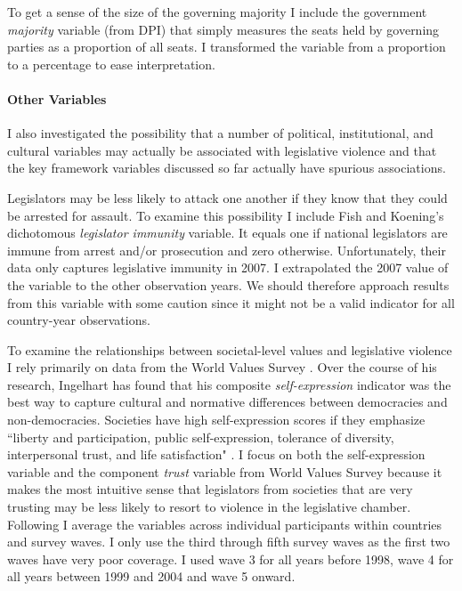 \documentclass[a4paper]{article}\usepackage{graphicx, color}
\begin{document}
To get a sense of the size of the governing majority I include the government {\emph{majority}} variable (from DPI) that simply measures the seats held by governing parties as a proportion of all seats. I transformed the variable from a proportion to a percentage to ease interpretation. 

\paragraph{Other Variables}

I also investigated the possibility that a number of political, institutional, and cultural variables may actually be associated with legislative violence and that the key framework variables discussed so far actually have spurious associations. 

Legislators may be less likely to attack one another if they know that they could be arrested for assault. To examine this possibility I include Fish and Koening's \citeyearpar{Fish2009} dichotomous \emph{legislator immunity} variable. It equals one if national legislators are immune from arrest and/or prosecution and zero otherwise. Unfortunately, their data only captures legislative immunity in 2007. I extrapolated the 2007 value of the variable to the other observation years. We should therefore approach results from this variable with some caution since it might not be a valid indicator for all country-year observations.

To examine the relationships between societal-level values and legislative violence I rely primarily on data from the World Values Survey \citep{WVS2009}. Over the course of his research, Ingelhart has found that his composite {\emph{self-expression}} indicator was the best way to capture cultural and normative differences between democracies and non-democracies. Societies have high self-expression scores if they emphasize ``liberty and participation, public self-expression, tolerance of diversity, interpersonal trust, and life satisfaction" \citep[64]{Inglehart2003}. I focus on both the self-expression variable and the component {\emph{trust}} variable from World Values Survey because it makes the most intuitive sense that legislators from societies that are very trusting may be less likely to resort to violence in the legislative chamber. Following \cite{Inglehart2003} I average the variables across individual participants within countries and survey waves. I only use the third through fifth survey waves as the first two waves have very poor coverage. I used wave 3 for all years before 1998, wave 4 for all years between 1999 and 2004 and wave 5 onward. 
\end{document}
